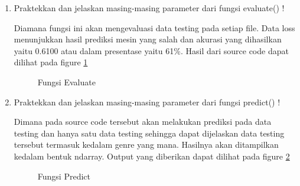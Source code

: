 \begin{enumerate}
\item Praktekkan dan jelaskan masing-masing parameter dari fungsi evaluate() !
	
	\subitem Diamana fungsi ini akan mengevaluasi data testing pada setiap file. Data loss menunjukkan hasil prediksi mesin yang salah dan akurasi yang dihasilkan yaitu 0.6100 atau dalam presentase yaitu 61\%. Hasil dari source code dapat dilihat pada figure \ref{YNC6-16}

	\begin{figure}[!htbp]
		\caption{Fungsi Evaluate}
		\label{YNC6-16}
	\end{figure} 	

\item Praktekkan dan jelaskan masing-masing parameter dari fungsi predict() !
	
	\subitem Dimana pada source code tersebut akan melakukan prediksi pada data testing dan hanya satu data testing sehingga dapat dijelaskan data testing tersebut termasuk kedalam genre yang mana. Hasilnya akan ditampilkan kedalam bentuk ndarray. Output yang diberikan dapat dilihat pada figure \ref{YNC6-17}

	\begin{figure}[!htbp]
		\caption{Fungsi Predict}
		\label{YNC6-17}
	\end{figure} 	

\end{enumerate}

